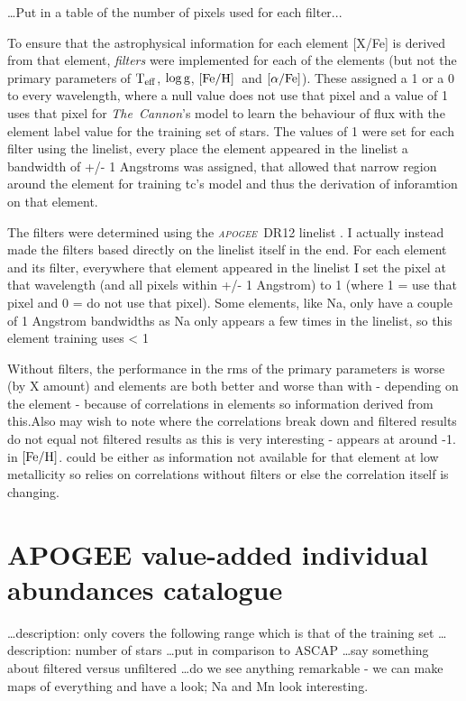 \documentclass[12pt, preprint]{aastex}
\newcommand{\project}[1]{\textsl{#1}}
\newcommand{\tc}{\project{The~Cannon}}
\newcommand{\apogee}{\project{\textsc{apogee}}}
\newcommand{\teff}{\mbox{$\rm T_{eff}$}}
\newcommand{\feh}{\mbox{$\rm [Fe/H]$}}
\newcommand{\alphafe}{\mbox{$\rm [\alpha/Fe]$}}
\newcommand{\logg}{\mbox{$\rm \log g$}}
\begin{document}
\ldots Put in a table of the number of pixels used for each filter...

To ensure that the astrophysical information for each element [X/Fe] is derived from that element, \textit{filters} were implemented for each of the elements 
(but not the primary parameters of \teff, \logg, \feh\ and \alphafe). These assigned a 1 or a 0 to every wavelength, where a null value does not use that pixel and a value of 1 uses that pixel for \tc's model to learn the behaviour of flux with the element label value for the training set of stars. The values of 1 were set for each filter using the linelist, every place the element appeared in the linelist a bandwidth of +/- 1 Angstroms was assigned, that allowed that narrow region around the element for training tc's model and thus the derivation of inforamtion on that element. 


The filters were determined using the \apogee\ DR12 linelist \citep{Shetrone2015}. 
I actually instead made the filters based directly on the linelist itself in the end. For each element and its filter, everywhere that element appeared in the linelist I set the pixel at that wavelength (and all pixels within +/- 1 Angstrom) to 1 (where 1 = use that pixel and 0 = do not use that pixel). Some elements, like Na, only have a couple of 1 Angstrom bandwidths as Na only appears a few times in the linelist, so this element training uses < 1 %

Without filters, the performance in the rms of the primary parameters is worse (by X amount) and elements are both better and worse than with - depending on the element - because of correlations in elements so information derived from this.Also may wish to note where the correlations break down and filtered results do not equal not filtered results as this is very interesting - appears at around -1. in \feh. could be either as information not available for that element at low metallicity so relies on correlations without filters or else the correlation itself is changing.   


\section{APOGEE value-added individual abundances catalogue}

\ldots description: only covers the following range which is that of the training set 
\ldots description: number of stars
\ldots put in comparison to ASCAP
\ldots say something about filtered versus unfiltered
\ldots do we see anything remarkable - we can make maps of everything and have a look; Na and Mn look interesting. 
\end{document}
